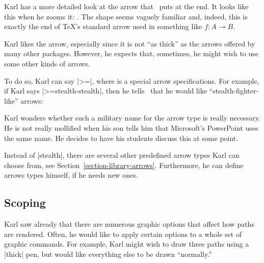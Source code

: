 \begin{codeexample}[]
\end{codeexample}

Karl has a more detailed look at the arrow that \tikzname\ puts at the
end. It looks like this when he zooms it: . The shape seems vaguely familiar and, indeed, this is
exactly the end of \TeX's standard arrow used in something like
$f\colon A \to B$.


Karl likes the arrow, especially since it is not ``as thick'' as the
arrows offered by many other packages. However, he expects that,
sometimes, he might wish to use some other kinds of arrows.

To do so, Karl can say |>=|, where
 is a special arrow specifications. For example, if Karl
says |>=stealth-stealth|, then he tells \tikzname\ that he would like 
``stealth-fighter-like'' arrows: 

\begin{codeexample}[]
\end{codeexample}

Karl wonders whether such a military name for the arrow type is really
necessary. He is not really mollified when his son tells him that
Microsoft's PowerPoint uses the same name. He decides to have his
students discuss this at some point.

Instead of |stealth|, there are several other predefined arrow types
Karl can choose from, see
Section~\ref{section-library-arrows}. Furthermore, he can define
arrows types himself, if he needs new ones. 




\subsection{Scoping}

Karl saw already that there are numerous graphic options that affect how
paths are rendered. Often, he would like to apply certain options to
a whole set of graphic commands. For example, Karl might wish to draw
three paths using a |thick| pen, but would like everything else to
be drawn ``normally.''

